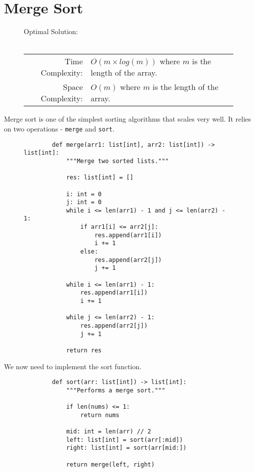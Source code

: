 
\section{Merge Sort}

\begin{figure}[H]
    Optimal Solution:\\\\
    \begin{tabular}{rl}
        Time Complexity:& \(O(m \times log(m))\) where \(m\) is the length of
        the array.\\
        Space Complexity:& \(O(m)\) where \(m\) is the length of the array.
    \end{tabular}
\end{figure}

Merge sort is one of the simplest sorting algorithms that scales very well. It
relies on two operations - \texttt{merge} and
\texttt{sort}.

\begin{figure}[H]
    \centering
    \begin{verbatim}
        def merge(arr1: list[int], arr2: list[int]) -> list[int]:
            """Merge two sorted lists."""

            res: list[int] = []

            i: int = 0
            j: int = 0
            while i <= len(arr1) - 1 and j <= len(arr2) - 1:
                if arr1[i] <= arr2[j]:
                    res.append(arr1[i])
                    i += 1
                else:
                    res.append(arr2[j])
                    j += 1
            
            while i <= len(arr1) - 1:
                res.append(arr1[i])
                i += 1

            while j <= len(arr2) - 1:
                res.append(arr2[j])
                j += 1

            return res
    \end{verbatim}
\end{figure}

We now need to implement the sort function.

\begin{figure}[H]
    \centering
    \begin{verbatim}
        def sort(arr: list[int]) -> list[int]:
            """Performs a merge sort."""

            if len(nums) <= 1:
                return nums
            
            mid: int = len(arr) // 2
            left: list[int] = sort(arr[:mid])
            right: list[int] = sort(arr[mid:])

            return merge(left, right)
    \end{verbatim}
\end{figure}

